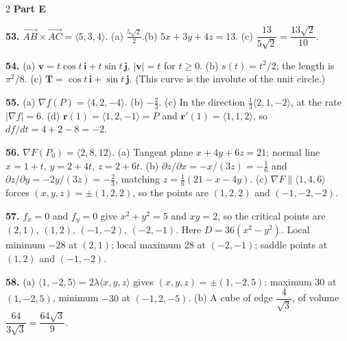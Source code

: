 \documentclass[11pt,oneside]{article}
\newcommand{\bi}{\mathbf{i}}
\newcommand{\bj}{\mathbf{j}}
\newcommand{\br}{\mathbf{r}}
\newcommand{\bv}{\mathbf{v}}
\newcommand{\bT}{\mathbf{T}}
\newcommand{\grad}{\nabla}
\newcommand{\pdi}[2]{\partial #1/\partial #2}
\newcounter{prob}
\begin{document}
{\begin{multicols}{2}
\vspace{4pt}
\textbf{Part E}\par\vspace{2pt}

\textbf{53.} $\overrightarrow{AB}\times\overrightarrow{AC}=\langle5,3,4\rangle$.
(a) $\tfrac{5\sqrt2}{2}$.\quad (b) $5x+3y+4z=13$.\quad
(c) $\dfrac{13}{5\sqrt2}=\dfrac{13\sqrt2}{10}$.

\textbf{54.} (a) $\bv=t\cos t\,\bi+t\sin t\,\bj$, $|\bv|=t$ for $t\ge0$.\quad
(b) $s(t)=t^{2}/2$; the length is $\pi^{2}/8$.\quad
(c) $\bT=\cos t\,\bi+\sin t\,\bj$. (This curve is the involute of the unit circle.)

\textbf{55.} (a) $\grad f(P)=\langle4,2,-4\rangle$.\quad
(b) $-\tfrac23$.\quad
(c) In the direction $\tfrac13\langle2,1,-2\rangle$, at the rate $|\grad f|=6$.\quad
(d) $\br(1)=\langle1,2,-1\rangle=P$ and $\br'(1)=\langle1,1,2\rangle$, so
$df/dt=4+2-8=-2$.

\textbf{56.} $\grad F(P_0)=\langle2,8,12\rangle$.
(a) Tangent plane $x+4y+6z=21$; normal line $x=1+t$, $y=2+4t$, $z=2+6t$.\quad
(b) $\pdi{z}{x}=-x/(3z)=-\tfrac16$ and $\pdi{z}{y}=-2y/(3z)=-\tfrac23$, matching
$z=\tfrac16(21-x-4y)$.\quad
(c) $\grad F\parallel\langle1,4,6\rangle$ forces $(x,y,z)=\pm(1,2,2)$, so the points are
$(1,2,2)$ and $(-1,-2,-2)$.

\textbf{57.} $f_x=0$ and $f_y=0$ give $x^{2}+y^{2}=5$ and $xy=2$, so the critical points are
$(2,1)$, $(1,2)$, $(-1,-2)$, $(-2,-1)$. Here $D=36\!\left(x^{2}-y^{2}\right)$.
Local minimum $-28$ at $(2,1)$; local maximum $28$ at $(-2,-1)$; saddle points at $(1,2)$ and
$(-1,-2)$.

\textbf{58.} (a) $\langle1,-2,5\rangle=2\lambda\langle x,y,z\rangle$ gives
$(x,y,z)=\pm(1,-2,5)$: maximum $30$ at $(1,-2,5)$, minimum $-30$ at $(-1,2,-5)$.\quad
(b) A cube of edge $\dfrac{4}{\sqrt3}$, of volume $\dfrac{64}{3\sqrt3}=\dfrac{64\sqrt3}{9}$.

\end{multicols}}

\vspace{10pt}
\noindent{\color{RuleGray}\rule{\linewidth}{0.5pt}}\par\vspace{5pt}
\end{document}
